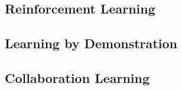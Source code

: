 \subsection{Reinforcement Learning}

\subsection{Learning by Demonstration}

\subsection{Collaboration Learning}